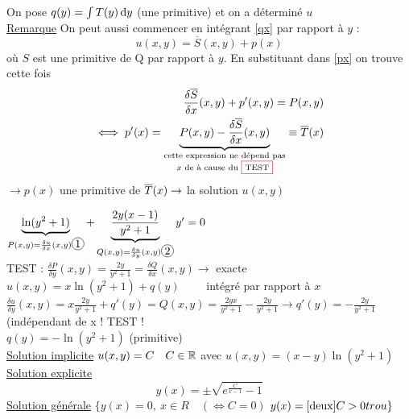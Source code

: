 \documentclass[12pt,a4paper]{article}
\begin{document}
On pose $q(y) = \int T(y) \, \mathrm d y$ (une primitive) et on a déterminé $u$\\
\uline{Remarque} On peut aussi commencer en intégrant \eqref{qx} par rapport à $y$ :
\begin{equation*}
	u(x,y) = \overline{S}(x,y) + p(x)
\end{equation*}
où $S$ est une primitive de Q par rapport à $y$. En substituant dans \eqref{px} on trouve cette fois
\begin{align*}
	\frac{\delta \overline{S}}{\delta x}(x,y) + p'(x,y) = P(x,y)\\
	\iff p'(x) = \underbrace{P(x,y) - \frac{\delta \overline{S}}{\delta x}(x,y)}_{\substack{\text{cette expression ne dépend pas}\\ x \text{ de à cause du \fcolorbox{red}{white}{TEST}}}} \equiv \overline{T}(x)
\end{align*}
$\to p(x)$ une primitive de $\overline{T}(x)\\
\to $ la solution $u(x,y)$

 $\underbrace{\ln(y^2 + 1)}_{P(x,y) = \frac{\delta u}{\delta x}(x,y) \circled{1}} + \underbrace{\frac{2y(x-1)}{y^2 + 1}}_{Q(x,y) = \frac{\delta u}{\delta y} (x,y)\circled{2}}y' = 0$\\
TEST : $\frac{\delta P}{\delta y}(x,y) = \frac{2y}{y^2 + 1} = \frac{\delta Q}{\delta x}(x,y) \to $ exacte\\
$u(x,y) = x \ln(y^2 + 1) + q(y)\qquad$  intégré par rapport à $x$\\
$\frac{\delta u}{\delta y}(x,y) = x\frac{2y}{y^2 + 1} + q'(y) = Q(x,y) = \frac{2yx}{y^2 + 1} - \frac{2y}{y^2 + 1} \to q'(y) = -\frac{2y}{y^2 + 1}$ (indépendant de x ! TEST !\\
$q(y) = - \ln(y^2 + 1)$ (primitive)\\
\uline{Solution implicite} $u(x,y) =C \quad C \in \mathbb{R}$ avec $u(x,y) = (x-y) \ln(y^2 + 1)$\\
\uline{Solution explicite} 
\begin{equation}
	y(x) = \pm \sqrt{e^{\frac{C}{x-1}}-1}
	\label{deux}
\end{equation}
\uline{Solution générale}
$\{y(x) = 0,\ x\in R \quad (\iff C=0)$
$y(x) = \eqref{deux} C > 0{trou}\}$







































 
\end{document}
